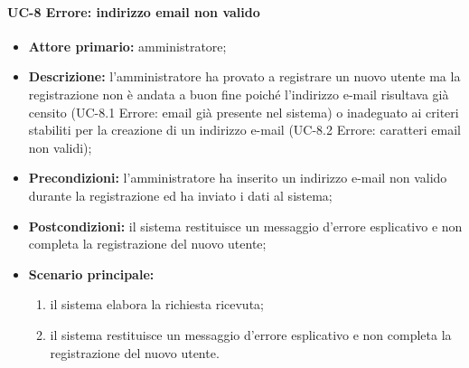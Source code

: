 \paragraph{UC-8 Errore: indirizzo email non valido}
\begin{itemize}
	\item \textbf{Attore primario:} amministratore;

	\item \textbf{Descrizione:} l'amministratore ha provato a registrare un nuovo utente ma la registrazione non è andata a buon fine poiché l'indirizzo e-mail risultava già censito (UC-8.1 Errore: email già presente nel sistema) o inadeguato ai criteri stabiliti per la creazione di un indirizzo e-mail (UC-8.2 Errore: caratteri email non validi);

	\item \textbf{Precondizioni:} l'amministratore ha inserito un indirizzo e-mail non valido durante la registrazione ed ha inviato i dati al sistema;

	\item \textbf{Postcondizioni:} il sistema restituisce un messaggio d'errore esplicativo e non completa la registrazione del nuovo utente;

	\item \textbf{Scenario principale:}
	      \begin{enumerate}
		      \item il sistema elabora la richiesta ricevuta;
		      \item il sistema restituisce un messaggio d'errore esplicativo e non completa la registrazione del nuovo utente.
	      \end{enumerate}
\end{itemize}

